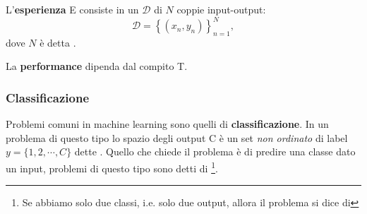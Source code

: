 \documentclass[10pt]{article}
\begin{document}
L'\textbf{esperienza} E consiste in un  $\mathcal{D}$ di $N$ coppie input-output:
\begin{equation}
\mathcal{D} = \left\{ (x_n, y_n) \right\}_{n=1}^N,
\end{equation}
dove $N$ è detta .

La \textbf{performance} dipenda dal compito T.

\subsubsection{Classificazione}
Problemi comuni in machine learning sono quelli di \textbf{classificazione}. In un problema di questo tipo lo spazio degli output C è un set \textit{non ordinato} di label $y = \{ 1, 2, \cdots, C \}$ dette . Quello che chiede il problema è di predire una classe dato un input, problemi di questo tipo sono detti di \footnote{Se abbiamo solo due classi, i.e. solo due output, allora il problema si dice di }.
\end{document}
